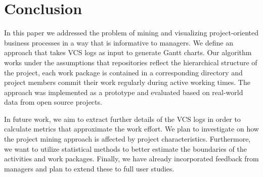 \section{Conclusion}
\label{sec:bpm2015outro}

In this paper we
addressed the problem of mining and visualizing project-oriented business processes in a way that is informative to managers. We define an approach that takes VCS logs as input to generate Gantt charts.
Our algorithm works under the assumptions that repositories reflect the hierarchical structure of the project, each work package is contained in a corresponding directory and project members commit their work regularly during active working times.
The approach was implemented as a prototype and evaluated based on real-world data from open source projects.

In future work, we aim to extract further details of the VCS logs in order to calculate metrics that approximate the work effort. %
We plan to investigate on how the project mining approach is affected by project characteristics. Furthermore, we want to utilize statistical methods to better estimate the boundaries of the activities and work packages. Finally, we have already incorporated feedback from managers and plan to extend these to full user studies.

